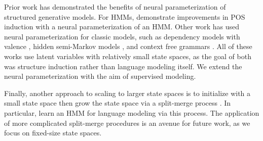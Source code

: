 \documentclass[11pt,a4paper]{article}
\begin{document}
Prior work has demonstrated the benefits of neural parameterization of structured generative models. 
For HMMs, \citet{tran2016hmm} demonstrate improvements in POS induction with a
neural parameterization of an HMM.
Other work has used neural parameterization for classic models, such as 
dependency models with valence \citep{han2017dependency},
hidden semi-Markov models \citep{wiseman2018hsmm},
and context free grammars \citep{kim2019cpcfg}.
All of these works use latent variables with relatively small state spaces,
as the goal of both was structure induction rather than language modeling itself.
We extend the neural parameterization with the aim of supervised modeling.

\begin{comment}
We also draw inspiration from the experiments with
cloned HMMs by \citet{dedieu2019learning},
who propose to introduce sparsity constraints in scalar
emission distribution of HMMs in order to make conditional inference
tractable in large state spaces.
They train a 30k state HMM on character-level language modeling
by constraining every state to emit only a single character type.
This particular constraint is problematic for language modeling at the word level,
where the vocabulary size is much larger.
We build on their work by proposing a sparsity constraint based on
Brown clustering \citep{brown1992} which allows us to extend their
work to vocabularies that are larger than the state space.
\end{comment}


Finally, another approach to scaling to larger state spaces is to initialize
with a small state space then grow the state space via a split-merge process
\citep{petrov2006splitmerge,huang2011thesis}.
In particular, \citet{huang2011thesis} learn an HMM for language modeling
via this process.
The application of more complicated split-merge
procedures is an avenue for future work,
as we focus on fixed-size state spaces.

\end{document}
